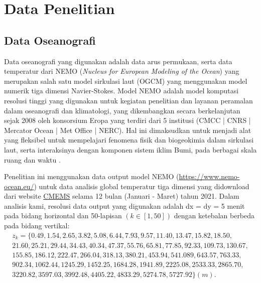 \section[Data Penelitian]{Data Penelitian}
\begin{spacing}{1.5}
\vspace{-1pc}
\subsection[Data Oseanografi]{Data Oseanografi}
	Data oseanografi yang digunakan adalah data arus permukaan, serta data temperatur dari NEMO (\textit{Nucleus for European Modeling of the Ocean}) yang merupakan salah satu model sirkulasi laut (OGCM) yang menggunakan model numerik tiga dimensi Navier-Stokes. Model NEMO adalah model komputasi resolusi tinggi yang digunakan untuk kegiatan penelitian dan layanan peramalan dalam oseanografi dan klimatologi, yang dikembangkan secara berkelanjutan sejak 2008 oleh konsorsium Eropa yang terdiri dari 5 institusi (CMCC | CNRS | Mercator Ocean | Met Office | NERC). Hal ini dimaksudkan untuk menjadi alat yang fleksibel untuk mempelajari fenomena fisik dan biogeokimia dalam sirkulasi laut, serta interaksinya dengan komponen sistem iklim Bumi, pada berbagai skala ruang dan waktu . 
	
	Penelitian ini menggunakan data output model NEMO (\href{https://www.nemo-ocean.eu/}{https://www.nemo-ocean.eu/}) untuk data analisis global temperatur tiga dimensi yang didownload dari website \href{https://resources.marine.copernicus.eu/products}{CMEMS} selama 12 bulan (Januari - Maret) tahun 2021.  Dalam analisis kami, resolusi data output yang digunakan adalah dx = dy = 5 menit pada bidang horizontal dan 50-lapisan $(k \in [1,50])$ dengan ketebalan berbeda pada bidang vertikal:
	\begin{equation*}
		\begin{aligned}
			z_k = \{0.49, 1.54, 2.65, 3.82, 5.08, 6.44, 7.93, 9.57, 11.40, 13.47, 15.82, 18.50, \\
			21.60, 25.21, 29.44, 34.43, 40.34, 47.37, 55.76, 65.81, 77.85, 92.33, 109.73, 130.67, \\
			155.85, 186.12, 222.47, 266.04, 318.13, 380.21, 453.94, 541.089, 643.57, 763.33, \\
			902.34, 1062.44, 1245.29, 1452.25, 1684.28, 1941.89, 2225.08, 2533.33, 2865.70,  \\
			3220.82, 3597.03, 3992.48, 4405.22, 4833.29, 5274.78, 5727.92 \} (m). \\
		\end{aligned}
	\end{equation*}

\end{spacing}
